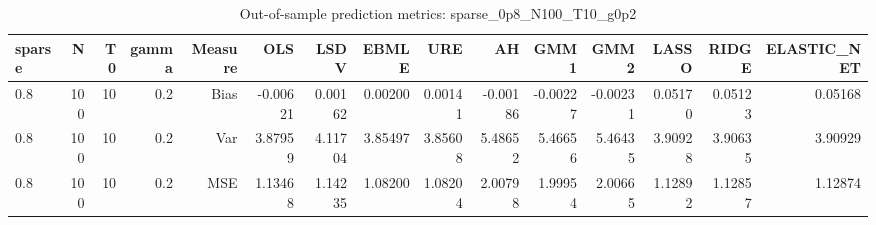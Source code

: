 \begin{table}[!htbp]\centering
\caption{Out-of-sample prediction metrics: sparse_0p8_N100_T10_g0p2}
\label{tab:table3_sparse_0p8_N100_T10_g0p2}
\begin{tabular}{lrrrrrrrrrrrrrr}
\hline
sparse & N & T0 & gamma & Measure & OLS & LSDV & EBMLE & URE & AH & GMM1 & GMM2 & LASSO & RIDGE & ELASTIC_NET \\
\hline
0.8 & 100 & 10 & 0.2 & Bias & -0.00621 & 0.00162 & 0.00200 & 0.00141 & -0.00186 & -0.00227 & -0.00231 & 0.05170 & 0.05123 & 0.05168 \\
0.8 & 100 & 10 & 0.2 & Var & 3.87959 & 4.11704 & 3.85497 & 3.85608 & 5.48652 & 5.46656 & 5.46435 & 3.90928 & 3.90635 & 3.90929 \\
0.8 & 100 & 10 & 0.2 & MSE & 1.13468 & 1.14235 & 1.08200 & 1.08204 & 2.00798 & 1.99954 & 2.00665 & 1.12892 & 1.12857 & 1.12874 \\
\hline
\end{tabular}
\end{table}

